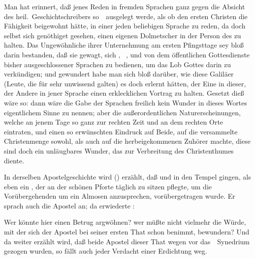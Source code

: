 \begin{aufza}
\item[]Man hat erinnert, daß jenes Reden in fremden Sprachen ganz gegen die Absicht des heil.\ Geschichtschreibers so~\ ausgelegt werde, als ob den ersten Christen die Fähigkeit beigewohnt hätte, in einer jeden beliebigen Sprache zu reden, da doch selbst  sich genöthiget gesehen, einen eigenen Dolmetscher in der Person des  zu halten. Das Ungewöhnliche ihrer Unternehmung am ersten Pfingsttage sey bloß darin bestanden, daß sie gewagt, sich , \dh\ , und von dem öffentlichen Gottesdienste bisher ausgeschlossener Sprachen zu bedienen, um das Lob Gottes darin zu verkündigen; und gewundert habe man sich bloß darüber, wie diese Galiläer (Leute, die für sehr unwissend galten) es doch erlernt hätten, der Eine in dieser, der Andere in jener Sprache einen erklecklichen Vortrag zu halten. Gesetzt dieß wäre so: dann wäre die Gabe der Sprachen freilich kein Wunder in dieses Wortes eigentlichem Sinne zu nennen; aber die außerordentlichen Naturerscheinungen, welche an jenem Tage so ganz zur rechten Zeit und an dem rechten Orte eintraten, und einen so erwünschten Eindruck auf Beide, auf die versammelte Christenmenge sowohl, als auch auf die herbeigekommenen Zuhörer machte, diese sind doch ein unläugbares Wunder, das zur Verbreitung des Christenthumes diente.
\item In derselben Apostelgeschichte wird () erzählt, daß  und  in den Tempel gingen, als eben ein , der an der schönen Pforte täglich zu sitzen pflegte, um die Vorübergehenden um ein Almosen anzusprechen, vorübergetragen wurde. Er sprach auch die Apostel an; da erwiederte : 
\item[]Wer könnte hier einen Betrug argwöhnen? wer müßte nicht vielmehr die Würde, mit der sich der Apostel bei seiner ersten That schon benimmt, bewundern? Und da weiter erzählt wird, daß beide Apostel dieser That wegen vor das~\ Synedrium gezogen wurden, so fällt auch jeder Verdacht einer Erdichtung weg.

\end{aufza}
